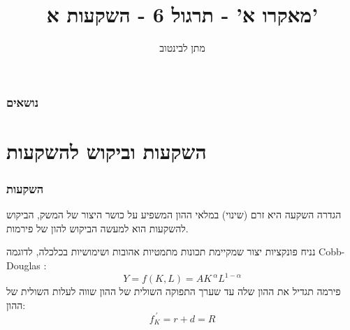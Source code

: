 \documentclass[usenames,dvipsnames]{beamer}
\title[]{{מאקרו א' - תרגול 6 - השקעות א'}}
\author{\texthebrew{ מתן לבינטוב}}
\institute[{{ אב"ג}}]{{ אוניברסיטת בן גוריון בנגב}}
\date{}
\begin{document}
\begin{RTL}
\begin{frame}
\titlepage
\end{frame}
\begin{frame}
    \frametitle{נושאים}
    \tableofcontents
    

\end{frame}
\section{השקעות וביקוש להשקעות}
\begin{frame}
    \frametitle{השקעות}
    \begin{exampleblock}{הגדרה}
        השקעה היא זרם (שינוי) במלאי ההון המשפיע על כושר היצור של המשק, הביקוש להשקעות הוא למעשה הביקוש להון של פירמות.
    \end{exampleblock}
    נניח פונקציות יצור שמקיימת תכונות מתמטיות אהובות ושימושיות בכלכלה, לדוגמה Cobb-Douglas :
    \[Y = f\left(K,L\right) = AK^{\ \alpha} L^{1-\alpha}\]
    פירמה תגדיל את ההון שלה עד שערך התפוקה השולית של ההון שווה לעלות השולית של ההון:
    \[f^{\ \prime}_K = r + d = R \]
    

\end{frame}

\end{RTL}
\end{document}
